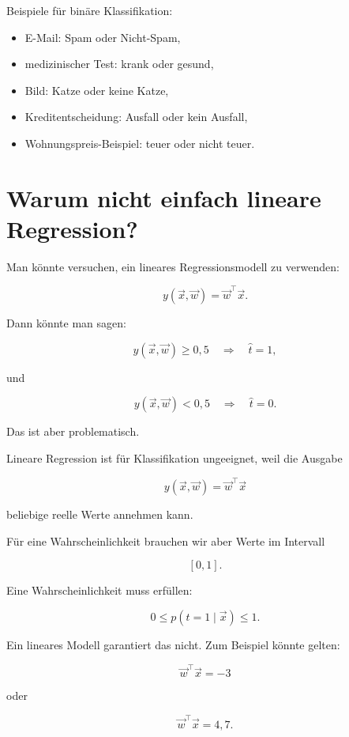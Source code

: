 Beispiele für binäre Klassifikation:

\begin{itemize}
    \item E-Mail: Spam oder Nicht-Spam,
    \item medizinischer Test: krank oder gesund,
    \item Bild: Katze oder keine Katze,
    \item Kreditentscheidung: Ausfall oder kein Ausfall,
    \item Wohnungspreis-Beispiel: teuer oder nicht teuer.
\end{itemize}

\section{Warum nicht einfach lineare Regression?}

Man könnte versuchen, ein lineares Regressionsmodell zu verwenden:

\[
    y(\vec{x},\vec{w})
    =
    \vec{w}^{\top}\vec{x}.
\]

Dann könnte man sagen:

\[
    y(\vec{x},\vec{w}) \geq 0{,}5
    \quad
    \Rightarrow
    \quad
    \hat{t}=1,
\]

und

\[
    y(\vec{x},\vec{w}) < 0{,}5
    \quad
    \Rightarrow
    \quad
    \hat{t}=0.
\]

Das ist aber problematisch.

\begin{conceptbox}
Lineare Regression ist für Klassifikation ungeeignet, weil die Ausgabe

\[
    y(\vec{x},\vec{w})
    =
    \vec{w}^{\top}\vec{x}
\]

beliebige reelle Werte annehmen kann.

Für eine Wahrscheinlichkeit brauchen wir aber Werte im Intervall

\[
    [0,1].
\]
\end{conceptbox}

Eine Wahrscheinlichkeit muss erfüllen:

\[
    0 \leq p(t=1\mid\vec{x}) \leq 1.
\]

Ein lineares Modell garantiert das nicht.
Zum Beispiel könnte gelten:

\[
    \vec{w}^{\top}\vec{x}
    =
    -3
\]

oder

\[
    \vec{w}^{\top}\vec{x}
    =
    4{,}7.
\]


